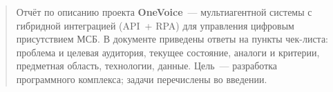 \begin{abstract}
\thispagestyle{empty}

Отчёт по описанию проекта \textbf{OneVoice}~--- мультиагентной системы с гибридной интеграцией (API~+ RPA) для управления цифровым присутствием МСБ. В документе приведены ответы на пункты чек-листа: проблема и целевая аудитория, текущее состояние, аналоги и критерии, предметная область, технологии, данные. Цель~--- разработка программного комплекса; задачи перечислены во введении.
\end{abstract}
